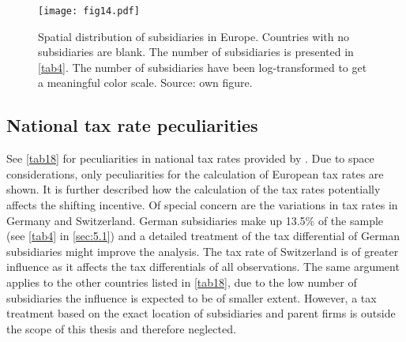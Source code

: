 \documentclass[10pt,twocolumn,oneside,cmyk]{article}
\begin{document}
\begin{figure}[h]
 \centering \captionsetup{width=0.95\linewidth}
   \texttt{[image: fig14.pdf]} 
 \caption[Spatial distribution of subsidiaries in Europe]{Spatial distribution of subsidiaries in Europe. Countries with no subsidiaries are blank. The number of subsidiaries is presented in \cref{tab4}. The number of subsidiaries have been log-transformed to get a meaningful color scale. Source: own figure.} \label{fig14}
\end{figure}

\subsection{National tax rate peculiarities}\label{app:C4}
See \cref{tab18} for peculiarities in national tax rates provided by \textcite{kpmg_corporate_2017}. Due to space considerations, only peculiarities for the calculation of European tax rates are shown. It is further described how the calculation of the tax rates potentially affects the shifting incentive. Of special concern are the variations in tax rates in Germany and Switzerland. German subsidiaries make up 13.5\% of the sample (see \cref{tab4} in \cref{sec:5.1}) and a detailed treatment of the tax differential of German subsidiaries might improve the analysis. The tax rate of Switzerland is of greater influence as it affects the tax differentials of all observations. The same argument applies to the other countries listed in \cref{tab18}, due to the low number of subsidiaries the influence is expected to be of smaller extent. However, a tax treatment based on the exact location of subsidiaries and parent firms is outside the scope of this thesis and therefore neglected.
\end{document}
